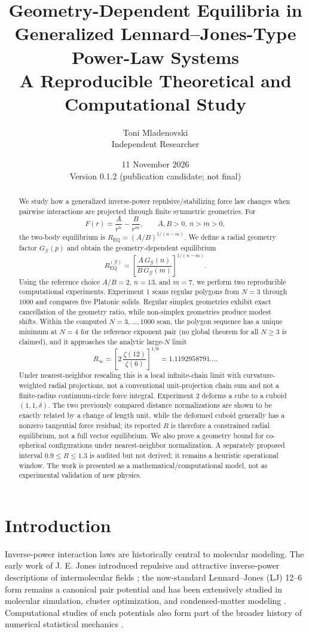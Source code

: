 \documentclass[11pt]{article}
\title{Geometry-Dependent Equilibria in Generalized Lennard--Jones-Type Power-Law Systems\\\large A Reproducible Theoretical and Computational Study}
\author{Toni Mladenovski\\Independent Researcher}
\date{11 November 2026\\Version 0.1.2 (publication candidate; not final)}
\begin{document}
\maketitle

\begin{abstract}
We study how a generalized inverse-power repulsive/stabilizing force law changes when pairwise interactions are projected through finite symmetric geometries. For
\[
F(r)=\frac{A}{r^n}-\frac{B}{r^m},\qquad A,B>0,\ n>m>0,
\]
the two-body equilibrium is $R_{\mathrm{EQ}}=(A/B)^{1/(n-m)}$. We define a radial geometry factor $G_{\mathcal G}(p)$ and obtain the geometry-dependent equilibrium
\[
R_{\mathrm{EQ}}^{(\mathcal G)}=\left[\frac{A\,G_{\mathcal G}(n)}{B\,G_{\mathcal G}(m)}\right]^{1/(n-m)}.
\]
Using the reference choice $A/B=2$, $n=13$, and $m=7$, we perform two reproducible computational experiments. Experiment 1 scans regular polygons from $N=3$ through $1000$ and compares five Platonic solids. Regular simplex geometries exhibit exact cancellation of the geometry ratio, while non-simplex geometries produce modest shifts. Within the computed $N=3,\ldots,1000$ scan, the polygon sequence has a unique minimum at $N=4$ for the reference exponent pair (no global theorem for all $N\ge3$ is claimed), and it approaches the analytic large-$N$ limit
\[
R_\infty=\left[2\,\frac{\zeta(12)}{\zeta(6)}\right]^{1/6}=1.1192958791\ldots.
\]
Under nearest-neighbor rescaling this is a local infinite-chain limit with curvature-weighted radial projections, not a conventional unit-projection chain sum and not a finite-radius continuum-circle force integral. Experiment 2 deforms a cube to a cuboid $(1,1,\delta)$. The two previously compared distance normalizations are shown to be exactly related by a change of length unit, while the deformed cuboid generally has a nonzero tangential force residual; its reported $R$ is therefore a constrained radial equilibrium, not a full vector equilibrium. We also prove a geometry bound for co-spherical configurations under nearest-neighbor normalization. A separately proposed interval $0.9\le R\le1.3$ is audited but not derived; it remains a heuristic operational window. The work is presented as a mathematical/computational model, not as experimental validation of new physics.
\end{abstract}

\section{Introduction}
Inverse-power interaction laws are historically central to molecular modeling. The early work of J. E. Jones introduced repulsive and attractive inverse-power descriptions of intermolecular fields \citep{Jones1924I,Jones1924II}; the now-standard Lennard--Jones (LJ) 12--6 form remains a canonical pair potential and has been extensively studied in molecular simulation, cluster optimization, and condensed-matter modeling \citep{SchwerdtfegerWales2024,WalesDoye1997,Romero1999}. Computational studies of such potentials also form part of the broader history of numerical statistical mechanics \citep{Metropolis1953}.
\end{document}
